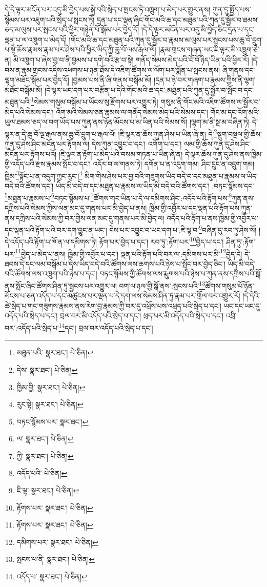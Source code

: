 དེ་དེ་ལྟར་མངོན་པར་འདུ་མི་བྱེད་པས་སྐྱེ་བའི་སྲེད་པ་སྤངས་ཏེ་འཁྲུག་པ་མེད་པར་གྱུར་ནས། ཀུན་དུ་སྤྱོད་པས་སྙོམས་པར་འཇུག་པའི་སྲེད་པ་སྤངས་ཏེ། དྲན་པ་དང་ལྡན་ཞིང་གོང་མའི་ཆ་དང་མཐུན་པའི་ཀུན་དུ་སྦྱོར་བ་ཐམས་ཅད་མ་ལུས་པར་སྤངས་པའི་ཕྱིར་གཉེན་པོ་སྒོམ་པར་བྱེད་དོ། །དེ་དེ་ལྟར་མངོན་པར་འདུ་མི་བྱེད་ཅིང་དྲན་པ་དང་ལྡན་པ་ལ་འཁྲུག་པ་མེད་དོ། །གོང་མའི་ཆ་དང་མཐུན་པའི་ཀུན་དུ་སྦྱོར་བ་རྣམས་མ་ལུས་པར་སྤངས་པས་ཆུ་བོ་དྲུག་པ་སྟེ་ཆོས་རྣམས་རྣམ་པར་ཤེས་པའི་ཕྱིར་ཡིད་ཀྱི་ཆུ་བོ་ལས་རྒལ་ལོ། །རྣམ་གྲངས་གཞན་ཡང་ཇི་ལྟར་མི་འཁྲུག་ཅེ་ན། མི་འཁྲུག་པ་ཞེས་བྱ་བ་ནི་བྱམས་པ་དགེ་བའི་རྩ་བ་སྟེ། གནོད་སེམས་མེད་པའི་ངོ་བོ་ཉིད་ཡིན་པའི་ཕྱིར་རོ། །དེ་བས་ན་རྣམ་གྲངས་འདིས་འཕགས་པ་ཉན་ཐོས་དེ་འཇིག་ཚོགས་ལ་ལོག་པར་སྨོན་པ་སྤངས་ནས། ཞི་གནས་དང་ལྷག་མཐོང་སྒོམ་པར་བྱེད་དོ། །བྱམས་པས་ནི་ཞི་གནས་བསྒོམ་མོ། །དྲན་པ་ཉེ་བར་གཞག་པ་རྣམས་ཀྱིས་ནི་ལྷག་མཐོང་བསྒོམ་མོ། །དེ་ལྟར་ཡང་དག་པར་བརྩོན་པ་དེའི་གོང་མའི་ཆ་དང་:མཐུན་པའི་ཀུན་དུ་སྦྱོར་བ་སྤོང་བ་དང་མཐུན་པའི་\footnote{མཐུན་པའི་  སྣར་ཐང་།  པེ་ཅིན། }སེམས་གསུམ་བསྒོམ་པ་ཡོངས་སུ་རྫོགས་པར་འགྱུར་ཏེ། གསུམ་ནི་གོང་མའི་འཇིག་ཚོགས་ལ་སྦྱོར་བ་མེད་པའི་སེམས་དང་། འོག་མའི་སེམས་ཅན་རྣམས་ལ་གནོད་སེམས་མེད་པའི་སེམས་དང་། གོང་མ་དང་འོག་མའི་ཡུལ་ཐམས་ཅད་ལ་བག་ཡོད་པས་ཀུན་ནས་ཉོན་མོངས་པ་མ་ཡིན་པའི་སེམས་སོ། །ལྷག་མ་ནི་སྔ་མ་བཞིན་ཏེ། དེ་ལྟར་ན་དེ་ཆུ་བོ་ལྔ་རྒལ་ནས་ཆུ་བོ་དྲུག་པ་རྒལ་ལོ། །ཇི་ལྟར་ན་ཆོས་ཀུན་ཤེས་པ་ཡིན་ཞེ་ན། དེ་\footnote{དེས་  སྣར་ཐང་།  པེ་ཅིན། }སྡུག་བསྔལ་གྱི་ཆོས་ཀུན་དུ་ཤེས་ཤིང་མངོན་པར་རྟོགས་ལ། དེས་ཀུན་འབྱུང་བ་དང་། འགོག་པ་དང་། ལམ་གྱི་ཆོས་ཀུན་དུ་ཤེས་ཤིང་མངོན་པར་རྟོགས་པའོ། །ཇི་ལྟར་ན་རྟོག་པ་མེད་པའི་བསམ་གཏན་པ་ཡིན་ཞེ་ན། དེ་ལྟར་ཆོས་ཀུན་དུ་ཤེས་ནས་ཁྱིམ་གྱི་འདོད་པའི་རྫས་རྣམས་སྤོང་བ་དང་། འདོར་བ་ལ་གནས་ཏེ། དགོན་པ་ན་འདུག་གམ། ཤིང་དྲུང་ན་འདྲུག་གམ། ཁྱིམ་\footnote{ཁྱིམ་གྱི་  སྣར་ཐང་།  པེ་ཅིན། }སྟོང་པ་ན་འདུག་ཀྱང་རུང་།\footnote{རུང་སྟེ།  སྣར་ཐང་།  པེ་ཅིན། } མིག་གིས་ཤེས་པར་བྱ་བའི་གཟུགས་ཡིད་བདེ་བ་དང་མཐུན་པ་རྣམས་ལ་ཡིད་བདེ་བའི་ཚོགས་དང་། ཡིད་མི་བདེ་བ་དང་མཐུན་པ་རྣམས་ལ་ཡིད་མི་བདེ་བའི་ཚོགས་དང་། :བཏང་སྙོམས་དང་\footnote{བཏང་སྙོམས་པར་  སྣར་ཐང་། }མཐུན་པ་རྣམས་པ་\footnote{ལ་  སྣར་ཐང་།  པེ་ཅིན། }བཏང་སྙོམས་པ་\footnote{ཀྱི་  སྣར་ཐང་།  པེ་ཅིན། }ཚོགས་གང་ཡིན་པ་དེ་ལ་དམིགས་ཤིང་:འདོད་པའི་རྟོག་པས་\footnote{འདོད་པའི་  པེ་ཅིན། }ཀུན་ནས་དཀྲིས་པའི་སེམས་ཀྱིས་ལན་མང་དུ་གནས་པར་མི་བྱེད་པ་ནས། ཁྱིམ་གྱི་འབྱོར་པ་དང་ལྡན་པའི་རྟོག་པས་ཀུན་ནས་དཀྲིས་པའི་སེམས་ཀྱི་བར་གྱིས་ལན་མང་དུ་གནས་པར་མི་བྱེད་ལ། འདོད་པའི་རྟོག་པ་ནས་ཁྱིམ་གྱི་འབྱོར་པ་དང་ལྡན་པའི་རྟོག་པའི་བར་དག་བྱུང་ན་ཡང་། ངེས་པར་འབྱུང་བ་ཡང་དག་པ་:ཇི་ལྟ་བ་\footnote{ཇི་ལྟ་  སྣར་ཐང་།  པེ་ཅིན། }བཞིན་དུ་རབ་ཏུ་ཤེས་སོ། །དེ་འདོད་པའི་རྟོག་པ་ཁོ་ན་ལ་དམིགས་ཏེ། རྟོག་པར་བྱེད་པ་དང་། རབ་ཏུ་:རྟོག་པར་\footnote{རྟོགས་པར་  སྣར་ཐང་།  པེ་ཅིན། }བྱེད་པ་དང་། ཤིན་ཏུ་:རྟོག་པར་\footnote{རྟོགས་པར་  སྣར་ཐང་།  པེ་ཅིན། }བྱེད་པ་མེད་པ་ནས། ཁྱིམ་གྱི་འབྱོར་པ་དང་། ལྡན་པའི་རྟོག་པའི་བར་ལ་:དམིགས་པར་མི་\footnote{དམིགས་པར་  སྣར་ཐང་།  པེ་ཅིན། }བྱེད་དེ། དེ་ཐབས་དེ་དང་ལམ་བསྒོམ་པ་དེས་ཡིད་བདེ་བའི་ཚོགས་ལས་ཆགས་པའི་ཉེས་པ་སྤོང་བར་བྱེད་ཅིང་། ཡིད་མི་བདེ་བའི་ཚོགས་ལས་འཁྲུག་པའི་ཉེས་པ་དང་། བཏང་སྙོམས་ཀྱི་ཚོགས་ལས་རྨུགས་པའི་ཉེས་པ་ཀུན་ནས་དཀྲིས་པའི་སྒོ་ནས་སྤོང་ཞིང་ཚོགས་ཤིན་ཏུ་སྦྱངས་པར་འགྱུར་ལ། བག་ལ་ཉལ་གྱི་སྒོ་ནས་:སྤངས་པའི་\footnote{སྤངས་པ་ནི་  སྣར་ཐང་།  པེ་ཅིན། }ཚོགས་གསུམ་པོ་ཉོན་མོངས་པ་ཅན་འདོད་པ་དང་མཚུངས་པར་ལྡན་པ་དེ་དག་ལས་སེམས་ཤིན་ཏུ་རྣམ་པར་གྲོལ་བར་འགྱུར་རོ། །དེ་དེའི་ཚེ་སྲེད་པ་གང་གཟུགས་རྣམས་ནས་རེག་བྱ་རྣམས་ཀྱི་བར་དུ་འཕྲོས་པས་འཕྲད་པའི་སྲེད་པ་དང་། ཡང་དང་ཡང་དུ་འདོད་པའི་སྲེད་པ་དང་། བྲལ་བར་མི་འདོད་པའི་སྲེད་པ་དང་། ཕྲད་པར་མི་འདོད་པའི་སྲེད་པ་དང་། འབྲི་བར་:འདོད་པའི་སྲེད་པ་\footnote{འདོད་པ་  སྣར་ཐང་།  པེ་ཅིན། }དང་། བྲལ་བར་འདོད་པའི་སྲེད་པ་དང་། 